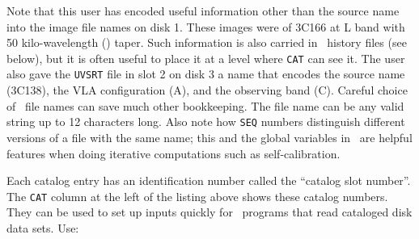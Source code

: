      Note that this user has encoded useful information other than the
source name into the image file names on disk 1.  These images were of
3C166 at L band with 50 kilo-wavelength (\uv) taper.  Such information
is also carried in \AIPS\ history files (see  below), but
it is often useful to place it at a level where {\tt CAT} can see it.
The user also gave the {\tt UVSRT} file in slot 2 on disk 3 a name
that encodes the source name (3C138), the VLA configuration (A), and
the observing band (C). Careful choice of \AIPS\ file names can save
much other bookkeeping.  The file name can be any valid string up to
12 characters long. Also note how {\tt SEQ} numbers distinguish
different versions of a file with the same name; this and the global
variables in \AIPS\ are helpful features when doing iterative
computations such as self-calibration.


     Each catalog entry has an identification number called the
``catalog slot number''.  The {\tt CAT} column at the left of the
listing above shows these catalog numbers.  They can be used to set up
inputs quickly for \AIPS\ programs that read cataloged disk data sets.
Use:
\btd
{}
\etd
{}
\btd
{}
\etd
{}


